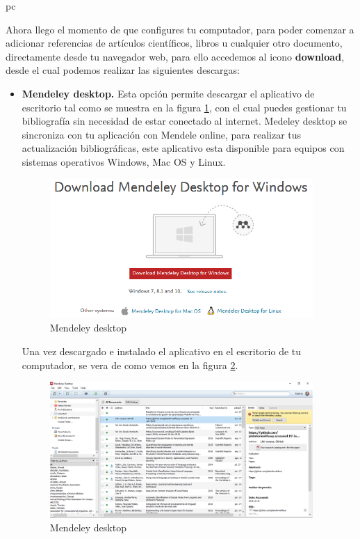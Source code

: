 pc\documentclass[a4paper,12pt,openany]{book}
\begin{document}
\begin{itemize}
Ahora llego el momento de que configures tu computador, para poder comenzar a adicionar referencias de artículos científicos, libros u cualquier otro documento, directamente desde tu navegador web, para ello accedemos al icono \textbf{download}, desde el cual podemos realizar las siguientes descargas:  

\begin{itemize}
\item \textbf{Mendeley desktop.} Esta opción permite descargar el aplicativo de escritorio tal como se muestra en la figura \ref{fig:mendeley2}, con el cual puedes gestionar tu bibliografía sin necesidad de estar conectado al internet. Medeley desktop se sincroniza con tu aplicación con Mendele online, para realizar tus actualización  bibliográficas, este aplicativo esta disponible para equipos con sistemas operativos Windows, Mac OS y Linux.

\begin{figure}[ht]
  \centering
	\includegraphics[width=10cm]{mendeley2.png}
\caption{Mendeley desktop}
  \label{fig:mendeley2}
\end{figure}

Una vez descargado e instalado el aplicativo en el escritorio de tu computador, se vera de como vemos en la figura \ref{fig:mendeley3}. 

\begin{figure}[H]
  \centering
	\includegraphics[width=10cm]{mendeley3.png}
\caption{Mendeley desktop}
  \label{fig:mendeley3}
\end{figure}


\end{itemize}
\end{itemize}
\end{document}
